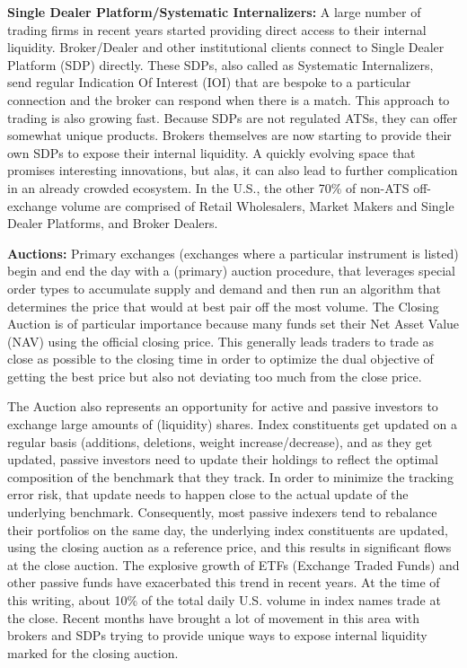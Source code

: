 \noindent\textbf{Single Dealer Platform/Systematic Internalizers:} A large number of trading firms in recent years started providing direct access to their internal liquidity. Broker/Dealer and other institutional clients connect to Single Dealer Platform (SDP) directly. These SDPs, also called as Systematic Internalizers, send regular Indication Of Interest (IOI) that are bespoke to a particular connection and the broker can respond when there is a match. This approach to trading is also growing fast. Because SDPs are not regulated ATSs, they can offer somewhat unique products. Brokers themselves are now starting to provide their own SDPs to expose their internal liquidity. A quickly evolving space that promises interesting innovations, but alas, it can also lead to further complication in an already crowded ecosystem. In the U.S., the other 70\% of non-ATS off-exchange volume are comprised of Retail Wholesalers, Market Makers and Single Dealer Platforms, and Broker Dealers.\twomedskip


\noindent\textbf{Auctions:} Primary exchanges (exchanges where a particular instrument is listed) begin and end the day with a (primary) auction procedure, that leverages special order types to accumulate supply and demand and then run an algorithm that determines the price that would at best pair off the most volume. The Closing Auction is of particular importance because many funds set their Net Asset Value (NAV) using the official closing price. This generally leads traders to trade as close as possible to the closing time in order to optimize the dual objective of getting the best price but also not deviating too much from the close price. \label{in:close1}


The Auction also represents an opportunity for active and passive investors to exchange large amounts of (liquidity) shares. Index constituents get updated on a regular basis (additions, deletions, weight increase/decrease), and as they get updated, passive investors need to update their holdings to reflect the optimal composition of the benchmark that they track. In order to minimize the tracking error risk, that update needs to happen close to the actual update of the underlying benchmark. Consequently, most passive indexers tend to rebalance their portfolios on the same day, the underlying index constituents are updated, using the closing auction as a reference price, and this results in significant flows at the close auction. The explosive growth of ETFs (Exchange Traded Funds) and other passive funds have exacerbated this trend in recent years. At the time of this writing, about 10\% of the total daily U.S. volume in index names trade at the close. Recent months have brought a lot of movement in this area with brokers and SDPs trying to provide unique ways to expose internal liquidity marked for the closing auction. \twomedskip


